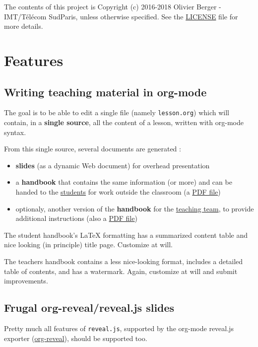 \documentclass[a4paper]{article}
\begin{document}
The contents of this project is Copyright (c) 2016-2018 Olivier
Berger - IMT/Télécom SudParis, unless otherwise specified. See the
\url{LICENSE} file for more details.

\section{Features}
\label{sec:orgcb2cd75}
\subsection{Writing teaching material in org-mode}
\label{sec:org09ed4dc}

The goal is to be able to edit a single file (namely \texttt{lesson.org})
which will contain, in a \textbf{single source}, all the content of a lesson,
written with org-mode syntax.

From this single source, several documents are generated :
\begin{itemize}
\item \textbf{slides} (as a dynamic Web document) for overhead presentation
\item a \textbf{handbook} that contains the same information (or more) and can be
handed to the \uline{students} for work outside the classroom (a \href{handbook.pdf}{PDF file})
\end{itemize}

\begin{itemize}
\item optionaly, another version of the \textbf{handbook} for the \uline{teaching team}, to provide additional instructions (also a \href{teacher-handbook.pdf}{PDF file})
\end{itemize}

\begin{NOTES}
The student handbook's \LaTeX{} formatting has a summarized content table and nice looking (in principle) title page. Customize at will.

The teachers handbook contains a less nice-looking format, includes a detailed table of contents, and has a watermark. Again, customize at will and submit improvements.
\end{NOTES}

\subsection{Frugal org-reveal/reveal.js slides}
\label{sec:orgc5a95db}

Pretty much all features of \texttt{reveal.js}, supported by the org-mode reveal.js exporter (\href{https://github.com/yjwen/org-reveal/}{org-reveal}), should be supported too.
\end{document}
